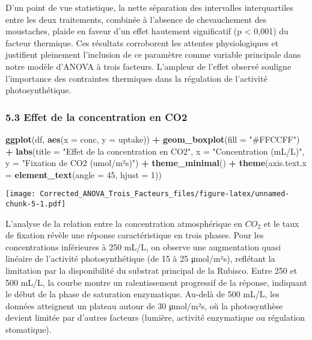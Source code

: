 \documentclass[
]{article}
\newenvironment{Shaded}{\begin{snugshade}}{\end{snugshade}}
\newcommand{\AttributeTok}[1]{\textcolor[rgb]{0.13,0.29,0.53}{#1}}
\newcommand{\DecValTok}[1]{\textcolor[rgb]{0.00,0.00,0.81}{#1}}
\newcommand{\FunctionTok}[1]{\textcolor[rgb]{0.13,0.29,0.53}{\textbf{#1}}}
\newcommand{\NormalTok}[1]{#1}
\newcommand{\SpecialCharTok}[1]{\textcolor[rgb]{0.81,0.36,0.00}{\textbf{#1}}}
\newcommand{\StringTok}[1]{\textcolor[rgb]{0.31,0.60,0.02}{#1}}
\begin{document}
D'un point de vue statistique, la nette séparation des intervalles
interquartiles entre les deux traitements, combinée à l'absence de
chevauchement des moustaches, plaide en faveur d'un effet hautement
significatif (p \textless{} 0,001) du facteur thermique. Ces résultats
corroborent les attentes physiologiques et justifient pleinement
l'inclusion de ce paramètre comme variable principale dans notre modèle
d'ANOVA à trois facteurs. L'ampleur de l'effet observé souligne
l'importance des contraintes thermiques dans la régulation de l'activité
photosynthétique.

\subsubsection{5.3 Effet de la concentration en
CO2}\label{effet-de-la-concentration-en-co2}

\begin{Shaded}
\begin{Highlighting}[]
\FunctionTok{ggplot}\NormalTok{(df, }\FunctionTok{aes}\NormalTok{(}\AttributeTok{x =}\NormalTok{ conc, }\AttributeTok{y =}\NormalTok{ uptake)) }\SpecialCharTok{+}
  \FunctionTok{geom\_boxplot}\NormalTok{(}\AttributeTok{fill =} \StringTok{"\#FFCCFF"}\NormalTok{) }\SpecialCharTok{+}
  \FunctionTok{labs}\NormalTok{(}\AttributeTok{title =} \StringTok{"Effet de la concentration en CO2"}\NormalTok{,}
       \AttributeTok{x =} \StringTok{"Concentration (mL/L)"}\NormalTok{, }\AttributeTok{y =} \StringTok{"Fixation de CO2 (umol/m²s)"}\NormalTok{) }\SpecialCharTok{+}
  \FunctionTok{theme\_minimal}\NormalTok{() }\SpecialCharTok{+}
  \FunctionTok{theme}\NormalTok{(}\AttributeTok{axis.text.x =} \FunctionTok{element\_text}\NormalTok{(}\AttributeTok{angle =} \DecValTok{45}\NormalTok{, }\AttributeTok{hjust =} \DecValTok{1}\NormalTok{))}
\end{Highlighting}
\end{Shaded}

\texttt{[image: Corrected\_ANOVA\_Trois\_Facteurs\_files/figure-latex/unnamed-chunk-5-1.pdf]}

L'analyse de la relation entre la concentration atmosphérique en
\(CO_2\) et le taux de fixation révèle une réponse caractéristique en
trois phases. Pour les concentrations inférieures à 250 mL/L, on observe
une augmentation quasi linéaire de l'activité photosynthétique (de 15 à
25 μmol/m²s), reflétant la limitation par la disponibilité du substrat
principal de la Rubisco. Entre 250 et 500 mL/L, la courbe montre un
ralentissement progressif de la réponse, indiquant le début de la phase
de saturation enzymatique. Au-delà de 500 mL/L, les données atteignent
un plateau autour de 30 μmol/m²s, où la photosynthèse devient limitée
par d'autres facteurs (lumière, activité enzymatique ou régulation
stomatique).
\end{document}
